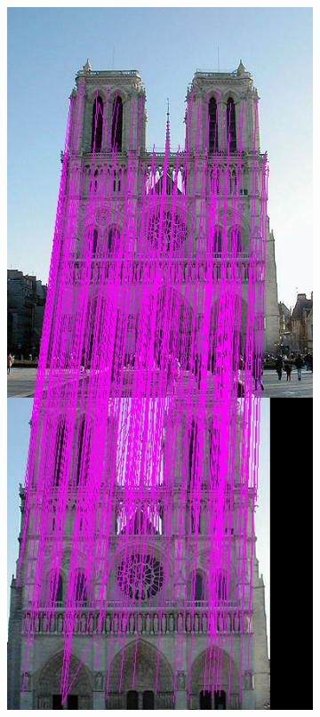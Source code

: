 \documentclass[10pt,a4paper]{article}
\begin{document}
\begin{figure}
	\centering
	\begin{subfigure}[b]{0.3\textwidth}
	\includegraphics[width=\textwidth]{sift/matches}

\end{subfigure}
\end{figure}
\end{document}
